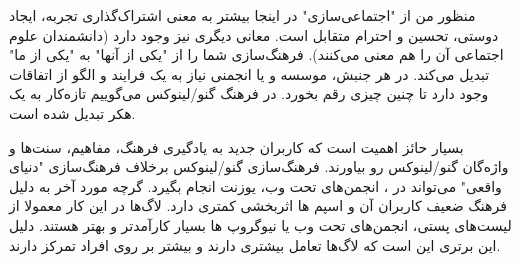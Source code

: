 
منظور من از "اجتماعی‌سازی" در اینجا بیشتر به معنی اشتراک‌گذاری تجربه،
ایجاد دوستی، تحسین و احترام متقابل است. معانی دیگری نیز وجود دارد
(دانشمندان علوم اجتماعی آن را
هم معنی می‌کنند).
فرهنگ‌سازی شما را از "یکی از آنها" به "یکی از ما" تبدیل می‌کند.
در هر جنبش، موسسه و یا انجمنی نیاز به یک فرایند و الگو از اتفاقات وجود دارد
تا چنین چیزی رقم بخورد. در فرهنگ گنو/لینوکس می‌گوییم تازه‌کار به یک هکر تبدیل شده است.


بسیار حائز اهمیت است که کاربران جدید به یادگیری فرهنگ، مفاهیم، سنت‌ها
و واژه‌گان گنو/لینوکس رو بیاورند. فرهنگ‌سازی گنو/لینوکس برخلاف فرهنگ‌سازی "دنیای واقعی"
می‌تواند در
،
انجمن‌های تحت وب، یوزنت انجام بگیرد. گرچه مورد آخر به دلیل فرهنگ ضعیف کاربران آن
و اسپم ها اثربخشی کمتری دارد.
لاگ‌ها در این کار معمولا از لیست‌های پستی، انجمن‌های تحت وب یا نیوگروپ ها بسیار کارآمدتر
و بهتر هستند. دلیل این برتری این است که لاگ‌ها تعامل بیشتری دارند و بیشتر بر روی
افراد تمرکز دارند.


